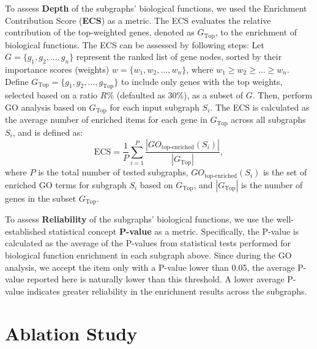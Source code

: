 To assess \textbf{Depth} of the subgraphs' biological functions, we used the Enrichment Contribution Score (\textbf{ECS}) as a metric.  
The ECS evaluates the relative contribution of the top-weighted genes, denoted as \( G_{\text{Top}} \), to the enrichment of biological functions. 
The ECS can be assessed by following steps:
Let \( G = \{ g_1, g_2, \dots, g_n \} \) represent the ranked list of gene nodes, sorted by their importance scores (weights) \( w = \{ w_1, w_2, \dots, w_n \} \), where \( w_1 \ge w_2 \ge \dots \ge w_n \).  
Define \( G_{\text{Top}} = \{ g_1, g_2, \dots, g_{\text{Top}} \} \) to include only genes with the top weights, selected based on a ratio \( R\% \) (defaulted as 30\%), as a subset of \( G \).
Then, perform GO analysis based on \( G_{\text{Top}} \) for each input subgraph \( S_i \).
The ECS is calculated as the average number of enriched items for each gene in \( G_{\text{Top}} \) across all subgraphs \( S_i \), and is defined as:
\[
\text{ECS} = \frac{1}{P} \sum_{i=1}^{P} \frac{|GO_{\text{top-enriched}}(S_i)|}{|G_{\text{Top}}|},
\]
where \( P \) is the total number of tested subgraphs, \( GO_{\text{top-enriched}}(S_i) \) is the set of enriched GO terms for subgraph \( S_i \) based on \( G_{\text{Top}} \), and \( |G_{\text{Top}}| \) is the number of genes in the subset \( G_{\text{Top}} \).

To assess \textbf{Reliability} of the subgraphs' biological functions, we use the well-established statistical concept \textbf{P-value} as a metric. 
Specifically, the P-value is calculated as the average of the P-values from statistical tests performed for biological function enrichment in each subgraph above.
Since during the GO analysis, we accept the item only with a P-value lower than 0.05, the average P-value reported here is naturally lower than this threshold.
A lower average P-value indicates greater reliability in the enrichment results across the subgraphs.




\section{Ablation Study}

